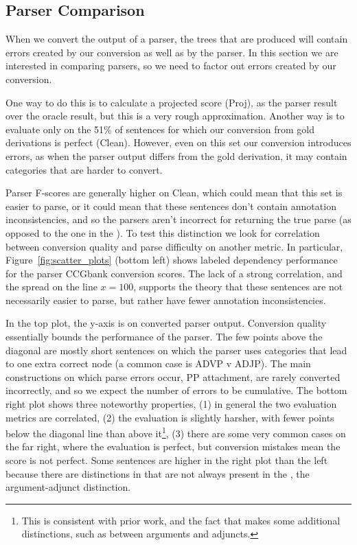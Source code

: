\subsection{Parser Comparison}

When we convert the output of a \ccg parser, the \ptb trees that are produced
will contain errors created by our conversion as well as by the parser. In this
section we are interested in comparing parsers, so we need to factor out errors
created by our conversion.

One way to do this is to calculate a projected score (Proj), as the
parser result over the oracle result, but this is a very rough approximation.
Another way is to evaluate only on the 51\% of sentences for which our
conversion from gold \ccg derivations is perfect (Clean).  However,
even on this set our conversion introduces errors, as when the parser output differs from the gold derivation, it may
contain categories that are harder to convert.

Parser F-scores are generally higher on Clean, which could mean that this
set is easier to parse, or it could mean that these sentences don't contain
annotation inconsistencies, and so the parsers aren't incorrect for returning
the true parse (as opposed to the one in the \ptb).  To test this distinction
we look for correlation between conversion quality and parse difficulty on
another metric.  In particular, Figure~\ref{fig:scatter_plots} (bottom left) shows
\ccg labeled dependency performance for the \candc parser \myvs CCGbank
conversion \parseval scores. The lack of a strong correlation, and the spread
on the line $x=100$, supports the theory that these sentences are not
necessarily easier to parse, but rather have fewer annotation inconsistencies.

In the top plot, the y-axis is \parseval on converted \candc parser output.
Conversion quality essentially bounds the performance of the parser.
The few points above the diagonal are mostly short sentences on which the \candc parser uses categories that lead to one extra correct node (a common case is ADVP v ADJP).
The main constructions on which parse errors occur, \myeg PP attachment, are rarely converted incorrectly, and so we expect the number of errors to be cumulative.
The bottom right plot shows three noteworthy properties, (1) in general the two evaluation metrics are correlated, (2) the \ccg evaluation is slightly harsher, with fewer points below the diagonal line than above it\footnote{This is consistent with prior work, and the fact that \ccg makes some additional distinctions, such as between arguments and adjuncts.}, (3) there are some very common cases on the far right, where the \ccg evaluation is perfect, but conversion mistakes mean the \ptb score is not perfect.
Some sentences are higher in the right plot than the left because there are distinctions in \ccg that are not always present in the \ptb, \myeg the argument-adjunct distinction.

